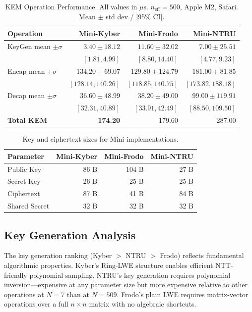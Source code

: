 \documentclass[12pt,a4paper]{report}
\begin{document}
\begin{table}[H]
\centering
\caption{KEM Operation Performance. All values in $\mu$s. $n_{\text{eff}} = 500$,
Apple M2, Safari. Mean $\pm$ std dev / [95\% CI].}
\label{tab:kem}
\begin{tabular}{l|r|r|r}
\toprule
\textbf{Operation} & \textbf{Mini-Kyber} & \textbf{Mini-Frodo} & \textbf{Mini-NTRU} \\
\midrule
KeyGen mean $\pm \sigma$ & $3.40 \pm 18.12$ & $11.60 \pm 32.02$ & $7.00 \pm 25.51$ \\
\quad [95\% CI] & $[1.81, 4.99]$ & $[8.80, 14.40]$ & $[4.77, 9.23]$ \\[3pt]
Encap mean $\pm \sigma$ & $134.20 \pm 69.07$ & $129.80 \pm 124.79$ & $181.00 \pm 81.85$ \\
\quad [95\% CI] & $[128.14, 140.26]$ & $[118.85, 140.75]$ & $[173.82, 188.18]$ \\[3pt]
Decap mean $\pm \sigma$ & $36.60 \pm 48.99$ & $38.20 \pm 49.00$ & $99.00 \pm 119.91$ \\
\quad [95\% CI] & $[32.31, 40.89]$ & $[33.91, 42.49]$ & $[88.50, 109.50]$ \\
\midrule
\textbf{Total KEM} & \textbf{174.20} & 179.60 & 287.00 \\
\bottomrule
\end{tabular}
\end{table}

\begin{table}[H]
\centering
\caption{Key and ciphertext sizes for Mini implementations.}
\label{tab:sizes}
\begin{tabular}{l|r|r|r}
\toprule
\textbf{Parameter} & \textbf{Mini-Kyber} & \textbf{Mini-Frodo} & \textbf{Mini-NTRU} \\
\midrule
Public Key & 86 B & 104 B & 27 B \\
Secret Key & 26 B & 25 B & 25 B \\
Ciphertext & 87 B & 41 B & 84 B \\
Shared Secret & 32 B & 32 B & 32 B \\
\bottomrule
\end{tabular}
\end{table}

\subsection{Key Generation Analysis}

The key generation ranking (Kyber $>$ NTRU $>$ Frodo) reflects fundamental algorithmic
properties. Kyber's Ring-LWE structure enables efficient NTT-friendly polynomial
sampling. NTRU's key generation requires polynomial inversion---expensive at any
parameter size but more expensive relative to other operations at $N=7$ than at
$N=509$. Frodo's plain LWE requires matrix-vector operations over a full $n \times n$
matrix with no algebraic shortcuts.
\end{document}
